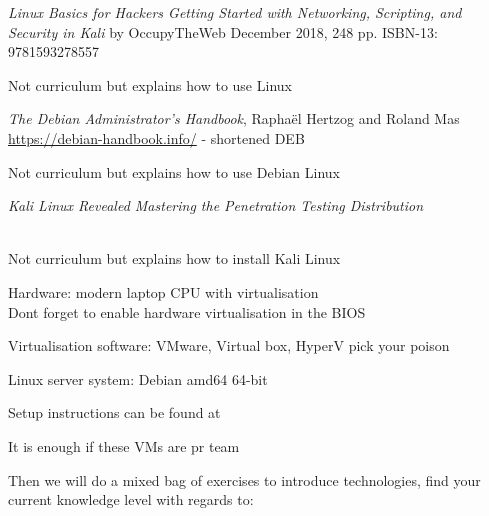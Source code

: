 \documentclass[Screen16to9,17pt]{foils}
\begin{document}


\emph{Linux Basics for Hackers
Getting Started with Networking, Scripting, and Security in Kali}
by OccupyTheWeb
December 2018, 248 pp.
ISBN-13:
9781593278557

Not curriculum but explains how to use Linux



\emph{The Debian Administrator’s Handbook}, Raphaël Hertzog and Roland Mas\\
\url{https://debian-handbook.info/} - shortened DEB

Not curriculum but explains how to use Debian Linux



\emph{Kali Linux Revealed  Mastering the Penetration Testing Distribution}

\\
Not curriculum but explains how to install Kali Linux






\begin{list2}
\item Hardware: modern laptop CPU with virtualisation\\
Dont forget to enable hardware virtualisation in the BIOS
\item Virtualisation software: VMware, Virtual box, HyperV pick your poison
\item Linux server system: Debian amd64 64-bit 
\item Setup instructions can be found at 
\end{list2}

\centerline{It is enough if these VMs are pr team}



Then we will do a mixed bag of exercises to introduce technologies, find your current knowledge level with regards to:
\end{document}
